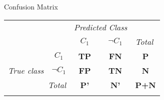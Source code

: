 \begin{frame}{Confusion Matrix}

	\vspace*{-1.5em}

	\begin{center}
		\begin{tabular}{lp{1cm}p{1cm}p{1cm}p{1cm}}
			                                                           &                                                                & \multicolumn{2}{c}{\textit{Predicted Class}}              & \multicolumn{1}{l}{}                                                                                \\ \cline{3-4}
			                                                           & \multicolumn{1}{l|}{}                                          & \multicolumn{1}{c|}{\cellcolor{faugray!62}\textbf{$C_1$}} & \multicolumn{1}{c|}{\cellcolor{faugray!62}\textbf{$\neg C_1$}} & \multicolumn{1}{l}{\textit{Total}} \\ \cline{2-5}
			\multicolumn{1}{c|}{}                                      & \multicolumn{1}{c|}{\cellcolor{faugray!62}\textbf{$C_1$}}      & \multicolumn{1}{c|}{\textbf{TP}}                          & \multicolumn{1}{c|}{\textbf{FN}}                               & \multicolumn{1}{c}{\textbf{P}}     \\ \cline{2-4}
			\multicolumn{1}{c|}{\multirow{-2}{*}{\textit{True class}}} & \multicolumn{1}{c|}{\cellcolor{faugray!62}\textbf{$\neg C_1$}} & \multicolumn{1}{c|}{\textbf{FP}}                          & \multicolumn{1}{c|}{\textbf{TN}}                               & \multicolumn{1}{c}{\textbf{N}}     \\ \cline{2-5}
			\multicolumn{2}{r|}{\textit{Total}}                        & \multicolumn{1}{c}{\textbf{P'}}                                & \multicolumn{1}{c|}{\textbf{N'}}                          & \multicolumn{1}{c}{\textbf{P+N}}                                                                    \\
			                                                           &                                                                &                                                           &                                                                &
		\end{tabular}
	\end{center}

	\vspace*{-0.5cm}


\end{frame}
